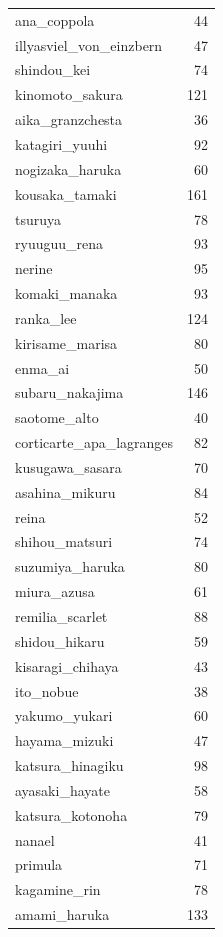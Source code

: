 \documentclass[11.5pt]{article}
\begin{document}
\begin{supertabular}[h!]{lr}
        ana\_coppola & 44 \\
        illyasviel\_von\_einzbern & 47 \\
        shindou\_kei & 74 \\
        kinomoto\_sakura & 121 \\
        aika\_granzchesta & 36 \\
        katagiri\_yuuhi & 92 \\
        nogizaka\_haruka & 60 \\
        kousaka\_tamaki & 161 \\
        tsuruya & 78 \\
        ryuuguu\_rena & 93 \\
        nerine & 95 \\
        komaki\_manaka & 93 \\
        ranka\_lee & 124 \\
        kirisame\_marisa & 80 \\
        enma\_ai & 50 \\
        subaru\_nakajima & 146 \\
        saotome\_alto & 40 \\
        corticarte\_apa\_lagranges & 82 \\
        kusugawa\_sasara & 70 \\
        asahina\_mikuru & 84 \\
        reina & 52 \\
        shihou\_matsuri & 74 \\
        suzumiya\_haruka & 80 \\
        miura\_azusa & 61 \\
        remilia\_scarlet & 88 \\
        shidou\_hikaru & 59 \\
        kisaragi\_chihaya & 43 \\
        ito\_nobue & 38 \\
        yakumo\_yukari & 60 \\
        hayama\_mizuki & 47 \\
        katsura\_hinagiku & 98 \\
        ayasaki\_hayate & 58 \\
        katsura\_kotonoha & 79 \\
        nanael & 41 \\
        primula & 71 \\
        kagamine\_rin & 78 \\
        amami\_haruka & 133 \\

\end{supertabular}
\end{document}

